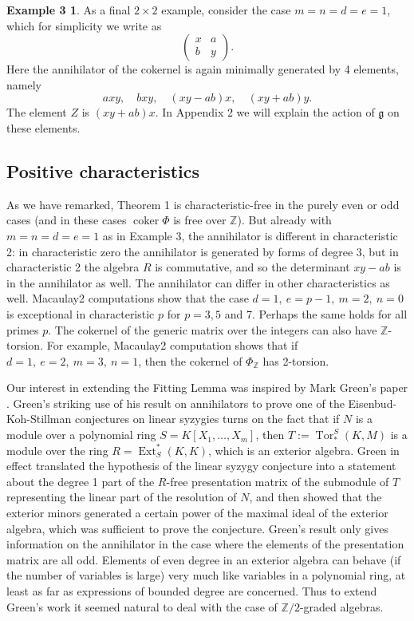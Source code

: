 \documentclass{tran-l}
\theoremstyle{plain}
\theoremstyle{remark}
\theoremstyle{definition}
\newtheorem*{definition3}{Example 3}
\newcommand{\g}{{\mathfrak g}}
\newcommand{\Tor}{\operatorname {Tor}}
\newcommand{\Ext}{\operatorname {Ext}}
\newcommand{\coker}{\operatorname{coker}}
\newcommand{\ZZ}{\mathbb {Z}}
\begin{document}
\begin{definition3} As a final $2\times 2$ example, consider the case
$m=n=d=e=1$, which for simplicity we write as
\begin{equation*}
\left(\begin{matrix}
x&a\\
b&y\end{matrix}\right).
\end{equation*}
Here the annihilator of the cokernel is again minimally generated
by 4 elements, namely
\begin{equation*}axy,\quad bxy,\quad (xy-ab)x,\quad (xy+ab)y.
\end{equation*}
The element $Z$ is $(xy+ab)x$.
In Appendix 2 we will explain the action of 
$\g $ on these elements.
\end{definition3}
\subsection*{{Positive characteristics}}As we have remarked, Theorem 1 is
characteristic-free in
the purely even or odd cases (and in these cases $\coker \Phi $
is free over $\ZZ $). But
already with $m=n=d=e=1$ as in Example 3, the annihilator is different 
in characteristic 2: in characteristic zero the annihilator is generated by forms of
degree 3, but in characteristic 2 the
algebra $R$ is commutative, and so
the determinant $xy-ab$ is in the annihilator as well.
The annihilator can differ in other characteristics as well. 
Macaulay2 computations show that the case
$d=1,\ e=p-1,\ m=2,\ n=0$ is exceptional in characteristic $p$
for $p=3, 5$  and 7. Perhaps the same holds
for all primes $p$.
The cokernel of the generic matrix over the integers
can also have $\ZZ $-torsion. For example, 
Macaulay2 computation shows that if $d=1,\ e=2,\ m=3,\ n=1$,
then the cokernel of $\Phi _{\ZZ }$ has 2-torsion.

Our interest in extending the Fitting Lemma
was inspired by Mark Green's paper
\cite{Gre}. Green's striking use of
his result on annihilators to prove one of the
Eisenbud-Koh-Stillman conjectures on
linear syzygies turns on the fact that if $N$ is a module
over a polynomial ring $S=K[X_{1},\dots ,X_{m}]$, then $T:=\Tor _{*}^{S}(K,M)$
is a module over the ring $R=\Ext _{S}^{*}(K,K)$, which is an
exterior algebra. Green in effect
translated the hypothesis of the linear syzygy
conjecture into a statement about the degree 1 part of the $R$-free
presentation
matrix of the submodule of $T$ representing the linear part of the
resolution of
$N$, and then showed that the exterior minors generated a certain
power of the maximal ideal of the exterior algebra, 
which was sufficient
to prove the conjecture.
Green's result only gives information on the annihilator in the
case where the elements of the presentation matrix are all odd.
Elements of even degree in an exterior algebra can behave (if the
number of variables is large) very much like variables in a polynomial
ring, at least as far as expressions of bounded degree are concerned.
Thus to extend Green's work it seemed natural to deal with the
case of $\ZZ /2$-graded algebras.
\end{document}
